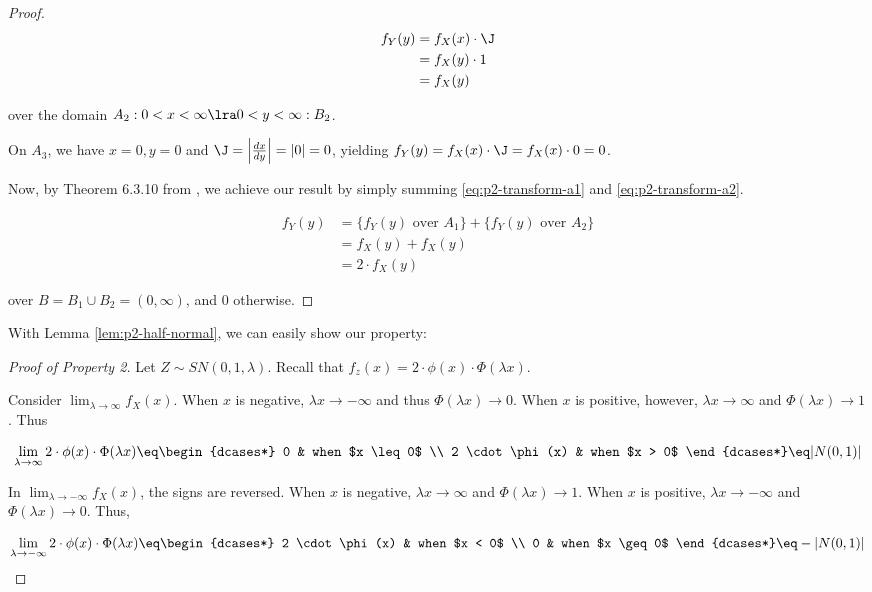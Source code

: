\documentclass{article}
\begin{document}
\begin{proof}
  \begin{align}
    f_Y(y) &= f_X(x) \cdot \J \nonumber \\
    &= f_X(y) \cdot 1 \nonumber \\
    &= f_X(y) \label{eq:p2-transform-a2}
  \end{align}

  over the domain $A_2: 0 < x < \infty \lra 0 < y < \infty :B_2$.

  On $A_3$, we have $x = 0, y = 0$ and $\J = \left| \frac{dx}{dy} \right| = |0|
  = 0$, yielding $f_Y(y) = f_X(x) \cdot \J = f_X(x) \cdot 0 = 0$.

  Now, by Theorem 6.3.10 from \citet{textbook}, we achieve our result by simply
  summing \eqref{eq:p2-transform-a1} and \eqref{eq:p2-transform-a2}.

  \begin{align}
    f_Y(y) &= \{ f_Y(y) \textrm{ over } A_1 \} + \{ f_Y(y) \textrm{ over } A_2 \} \nonumber \\
    &= f_X(y) + f_X(y) \nonumber \\
    &= 2 \cdot f_X(y) \label{eq:p2-transform-result}
  \end{align}

  over $B = B_1 \cup B_2 = (0, \infty)$, and 0 otherwise.
\end{proof}

With Lemma \ref{lem:p2-half-normal}, we can easily show our property:

\begin{proof}[Proof of Property 2]
  Let $Z \sim SN(0,1,\lambda)$. Recall that $f_z(x) = 2 \cdot \phi(x) \cdot
  \Phi(\lambda x)$.

  Consider $\lim_{\lambda \to \infty} f_X(x)$. When $x$ is negative, $\lambda x
  \to -\infty$ and thus $\Phi(\lambda x) \to 0$. When $x$ is positive, however,
  $\lambda x \to \infty$ and $\Phi(\lambda x) \to 1$. Thus

  \begin{equation}
    \label{eq:p2-positive-half-normal}
    \lim_{\lambda \to \infty} 2 \cdot \phi(x) \cdot \Phi(\lambda x) \eq
    \begin{dcases*}
      0 & when $x \leq 0$ \\
      2 \cdot \phi(x) & when $x > 0$
    \end{dcases*}
    \eq |N(0,1)|
  \end{equation}

  In $\lim_{\lambda \to -\infty} f_X(x)$, the signs are reversed. When $x$ is
  negative, $\lambda x \to \infty$ and $\Phi(\lambda x) \to 1$. When $x$ is
  positive, $\lambda x \to -\infty$ and $\Phi(\lambda x) \to 0$. Thus,

  \begin{equation}
    \label{eq:p2-negative-half-normal}
    \lim_{\lambda \to -\infty} 2 \cdot \phi(x) \cdot \Phi(\lambda x) \eq
    \begin{dcases*}
      2 \cdot \phi(x) & when $x < 0$ \\
      0 & when $x \geq 0$
    \end{dcases*}
    \eq -|N(0,1)|
  \end{equation}
\end{proof}
\end{document}
